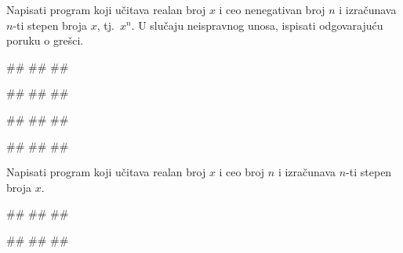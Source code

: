 \begin{Exercise}[label=PET_06] 
Napisati program koji učitava realan broj $x$ i ceo nenegativan broj
$n$ i izračunava $n$-ti stepen broja $x$, tj.~$x^n$.
U slučaju neispravnog unosa, ispisati odgovarajuću poruku o grešci.
 

\begin{miditest}
\begin{upotreba}{1}
#\naslovInt#
##
##
\end{upotreba}
\end{miditest}
\begin{miditest}
\begin{upotreba}{2}
#\naslovInt#
##
##
\end{upotreba}
\end{miditest}

\begin{miditest}
\begin{upotreba}{3}
#\naslovInt#
##
##
\end{upotreba}
\end{miditest}
\begin{miditest}
\begin{upotreba}{4}
#\naslovInt#
##
##
\end{upotreba}
\end{miditest}

\end{Exercise}
\ifresenja
\begin{Answer}[ref=PET_06]
\end{Answer}
\fi


\begin{Exercise}[label=PET_07]
Napisati program koji učitava realan broj $x$ i ceo broj
$n$ i izračunava $n$-ti stepen broja $x$. 
 

\begin{miditest}
\begin{upotreba}{1}
#\naslovInt#
##
##
\end{upotreba}
\end{miditest}
\begin{miditest}
\begin{upotreba}{2}
#\naslovInt#
##
##
\end{upotreba}
\end{miditest}
\end{Exercise}
\ifresenja
\begin{Answer}[ref=PET_07]
\end{Answer}
\fi



